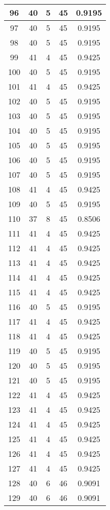 \documentclass[letterpaper, 12pt]{article}
\begin{document}
\begin{longtable}{|c|c|c|c|c|}
\hline
96 & 40 & 5 & 45 & 0.9195 \\
\hline
97 & 40 & 5 & 45 & 0.9195 \\
\hline
98 & 40 & 5 & 45 & 0.9195 \\
\hline
99 & 41 & 4 & 45 & 0.9425 \\
\hline
100 & 40 & 5 & 45 & 0.9195 \\
\hline
101 & 41 & 4 & 45 & 0.9425 \\
\hline
102 & 40 & 5 & 45 & 0.9195 \\
\hline
103 & 40 & 5 & 45 & 0.9195 \\
\hline
104 & 40 & 5 & 45 & 0.9195 \\
\hline
105 & 40 & 5 & 45 & 0.9195 \\
\hline
106 & 40 & 5 & 45 & 0.9195 \\
\hline
107 & 40 & 5 & 45 & 0.9195 \\
\hline
108 & 41 & 4 & 45 & 0.9425 \\
\hline
109 & 40 & 5 & 45 & 0.9195 \\
\hline
110 & 37 & 8 & 45 & 0.8506 \\
\hline
111 & 41 & 4 & 45 & 0.9425 \\
\hline
112 & 41 & 4 & 45 & 0.9425 \\
\hline
113 & 41 & 4 & 45 & 0.9425 \\
\hline
114 & 41 & 4 & 45 & 0.9425 \\
\hline
115 & 41 & 4 & 45 & 0.9425 \\
\hline
116 & 40 & 5 & 45 & 0.9195 \\
\hline
117 & 41 & 4 & 45 & 0.9425 \\
\hline
118 & 41 & 4 & 45 & 0.9425 \\
\hline
119 & 40 & 5 & 45 & 0.9195 \\
\hline
120 & 40 & 5 & 45 & 0.9195 \\
\hline
121 & 40 & 5 & 45 & 0.9195 \\
\hline
122 & 41 & 4 & 45 & 0.9425 \\
\hline
123 & 41 & 4 & 45 & 0.9425 \\
\hline
124 & 41 & 4 & 45 & 0.9425 \\
\hline
125 & 41 & 4 & 45 & 0.9425 \\
\hline
126 & 41 & 4 & 45 & 0.9425 \\
\hline
127 & 41 & 4 & 45 & 0.9425 \\
\hline
128 & 40 & 6 & 46 & 0.9091 \\
\hline
129 & 40 & 6 & 46 & 0.9091 \\

\end{longtable}
\end{document}
